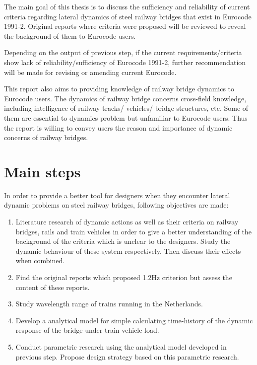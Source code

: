 

The main goal of this thesis is to discuss the sufficiency and reliability of current criteria regarding lateral dynamics of steel railway bridges that exist in Eurocode 1991-2. Original reports where criteria were proposed will be reviewed to reveal the background of them to Eurocode users. 

Depending on the output of previous step, if the current requirements/criteria show lack of reliability/sufficiency of Eurocode 1991-2, further recommendation will be made for revising or amending current Eurocode.

This report also aims to providing knowledge of railway bridge dynamics to Eurocode users. The dynamics of railway bridge concerns cross-field knowledge, including intelligence of railway tracks/ vehicles/ bridge structures, etc. Some of them are essential to dynamics problem but unfamiliar to Eurocode users. Thus the report is willing to convey users the reason and importance of dynamic concerns of railway bridges.



\section{Main steps}

In order to provide a better tool for designers when they encounter lateral dynamic problems on steel railway bridges, following objectives are made:

\begin{enumerate}

\item Literature research of dynamic actions as well as their criteria on railway bridges, rails and train vehicles in order to give a better understanding of the background of the criteria which is unclear to the designers. Study the dynamic behaviour of these system respectively. Then discuss their effects when combined.

\item Find the original reports which proposed 1.2Hz criterion but assess the content of these reports.

\item Study wavelength range of trains running in the Netherlands.

\item Develop a analytical model for simple calculating time-history of the dynamic response of the bridge under train vehicle load. 

\item Conduct parametric research using the analytical model developed in previous step. Propose design strategy based on this parametric research.

\end{enumerate}

